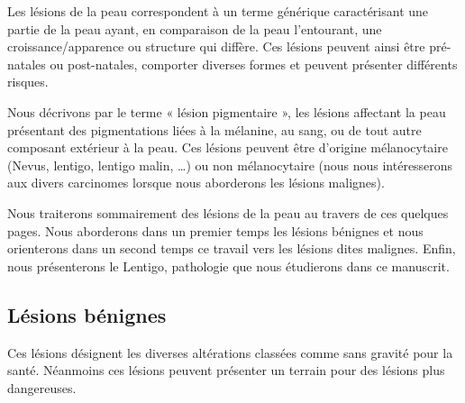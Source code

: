 Les lésions de la peau correspondent à un terme générique caractérisant une partie de la peau ayant, en comparaison de la peau l’entourant, une croissance/apparence ou structure qui diffère. Ces lésions peuvent ainsi être pré-natales ou post-natales, comporter diverses formes et peuvent présenter différents risques.\par

Nous décrivons par le terme « lésion pigmentaire », les lésions affectant la peau présentant des pigmentations liées à la mélanine, au sang, ou de tout autre composant extérieur à la peau. Ces lésions peuvent être d’origine mélanocytaire (Nevus, lentigo, lentigo malin, \ldots) ou non mélanocytaire (nous nous intéresserons aux divers carcinomes lorsque nous aborderons les lésions malignes).\par

Nous traiterons sommairement des lésions de la peau au travers de ces quelques pages. Nous aborderons dans un premier temps les lésions bénignes et nous orienterons dans un second temps ce travail vers les lésions dites malignes. Enfin, nous présenterons le Lentigo, pathologie que nous étudierons dans ce manuscrit.\par

\subsection{Lésions bénignes}
Ces lésions désignent les diverses altérations classées comme sans gravité pour la santé. Néanmoins ces lésions peuvent présenter un terrain pour des lésions plus dangereuses.\par

